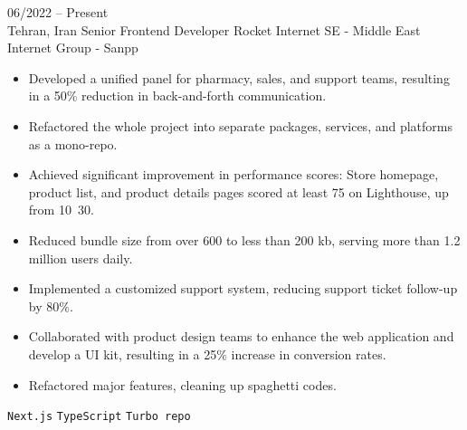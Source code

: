 \documentclass[9pt]{developercv} %
\begin{document}
    \vspace{-10 pt}
    \begin{entrylist}
        \entry
        {06/2022 -- Present \\ Tehran, Iran}
        {Senior Frontend Developer}
        {ًRocket Internet SE - Middle East Internet Group - Sanpp}
        {\vspace{-10pt}
            \begin{itemize}[noitemsep,topsep=0pt,parsep=0pt,partopsep=0pt, leftmargin=-1pt]
                \item Developed a unified panel for pharmacy, sales, and support teams, resulting in a 50\% reduction in back-and-forth communication.
                \item Refactored the whole project into separate packages, services, and platforms as a mono-repo.
                \item Achieved significant improvement in performance scores: Store homepage, product list, and product details pages scored at least 75 on Lighthouse, up from 10~30.
                \item Reduced bundle size from over 600 to less than 200 kb, serving more than 1.2 million users daily.
                \item Implemented a customized support system, reducing support ticket follow-up by 80\%.
                \item Collaborated with product design teams to enhance the web application and develop a UI kit, resulting in a 25\% increase in conversion rates.
                \item Refactored major features, cleaning up spaghetti codes.
            \end{itemize}
            \texttt{Next.js} \slashsep \texttt{TypeScript} \slashsep \texttt{Turbo repo}
        }


\end{entrylist}
\end{document}
